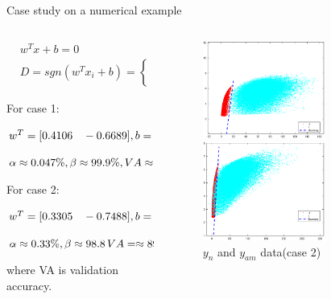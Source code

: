 \documentclass[10pt]{beamer}
\begin{document}
\begin{frame}{Case study on a numerical example}
    \begin{columns}
             \begin{column}{0.5\textwidth}
 \begin{small}
\begin{equation} \nonumber
\begin{aligned}
& w^Tx+b=0  \\
& D=sgn(w^Tx_i+b) = \left\{ 
    \begin{aligned}
  & -1  \\
  &\quad 1 
  \end{aligned}
     \right.
\end{aligned}
\end{equation}
\end{small}
For case 1: \par  $\small{w^T = [ 0.4106 \quad -0.6689]
 , b = -3.473} $\par $\small{\alpha \approx 0.047\%,\beta  \approx  99.9\%,VA \approx 99.93\%}$ \par 
For case 2:  \par $\small{w^T = [0.3305 \quad -0.7488]
 , b = -0.8336} $\par $\small{\alpha \approx 0.33\%  ,\beta  \approx  98.8 \,VA = \approx 89.83 \%}$ \par
 where VA is validation accuracy.
           \end{column}
        \begin{column}{0.5\textwidth} 
         \begin{figure}
        \centering
        \includegraphics[width=4cm]{fig/addHyper.eps}
        \caption{$y_n$ and $y_a$ data(case 1)}
        \includegraphics[width=4cm]{fig/ALhyperplane.eps}
        \caption{$y_n$ and $y_{am}$ data(case 2)}
        \end{figure}
        \end{column}
    \end{columns}
\end{frame}
\end{document}
